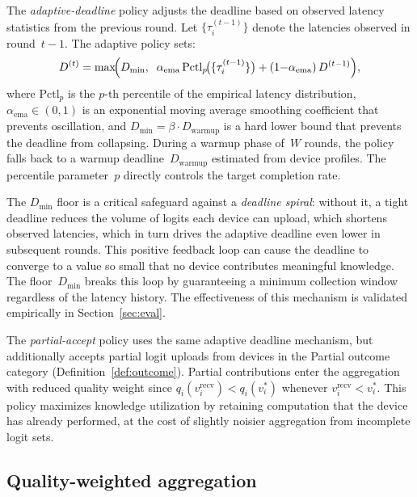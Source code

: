 \documentclass[a4paper,fleqn]{cas-dc}
\begin{document}
	The \emph{adaptive-deadline} policy adjusts the deadline based on
	observed latency statistics from the previous round.  Let
	$\{\tau_i^{(t-1)}\}$ denote the latencies observed in round~$t{-}1$.
	The adaptive policy sets:
	\begin{equation}\label{eq:adaptive}
		D^{(t)} = \max\!\Bigl(D_{\min},\;\;
		\alpha_{\mathrm{ema}} \,
		\mathrm{Pctl}_p\!\bigl(\{\tau_i^{(t-1)}\}\bigr)
		+ (1 {-} \alpha_{\mathrm{ema}}) \, D^{(t-1)}\Bigr),
	\end{equation}
	where $\mathrm{Pctl}_p$ is the $p$-th percentile of the empirical
	latency distribution, $\alpha_{\mathrm{ema}} \in (0,1)$ is an
	exponential moving average smoothing coefficient that prevents
	oscillation, and $D_{\min} = \beta \cdot D_{\mathrm{warmup}}$ is a
	hard lower bound that prevents the deadline from collapsing.  During a
	warmup phase of~$W$ rounds, the policy falls back to a warmup
	deadline~$D_{\mathrm{warmup}}$ estimated from device profiles.  The
	percentile parameter~$p$ directly controls the target completion rate.
	
	The $D_{\min}$ floor is a critical safeguard against a
	\emph{deadline spiral}: without it, a tight deadline reduces the
	volume of logits each device can upload, which shortens observed
	latencies, which in turn drives the adaptive deadline even lower in
	subsequent rounds.  This positive feedback loop can cause the deadline
	to converge to a value so small that no device contributes meaningful
	knowledge.  The floor~$D_{\min}$ breaks this loop by guaranteeing a
	minimum collection window regardless of the latency history.  The
	effectiveness of this mechanism is validated empirically in
	Section~\ref{sec:eval}.
	
	The \emph{partial-accept} policy uses the same adaptive deadline
	mechanism, but additionally accepts partial logit uploads from devices
	in the Partial outcome category (Definition~\ref{def:outcome}).
	Partial contributions enter the aggregation with reduced quality
	weight since $q_i(v_i^{\mathrm{recv}}) < q_i(v_i^*)$ whenever
	$v_i^{\mathrm{recv}} < v_i^*$.  This policy maximizes knowledge
	utilization by retaining computation that the device has already
	performed, at the cost of slightly noisier aggregation from
	incomplete logit sets.
	
	\subsection{Quality-weighted aggregation}\label{sec:aggregation}
	
\end{document}
